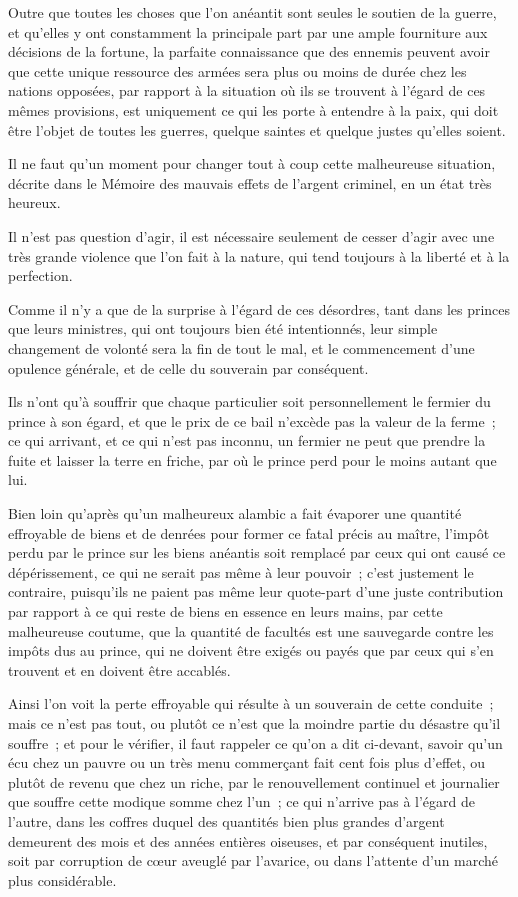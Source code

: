 \documentclass[french,twoside]{book} %
\begin{document}
Outre que toutes les choses que l’on anéantit sont seules le soutien de la guerre, et qu’elles y ont constamment la principale part par une ample fourniture aux décisions de la fortune, la parfaite connaissance que des ennemis peuvent avoir que cette unique ressource des armées sera plus ou moins de durée chez les nations opposées, par rapport à la situation où ils se trouvent à l’égard de ces mêmes provisions, est uniquement ce qui les porte à entendre à la paix, qui doit être l’objet de toutes les guerres, quelque saintes et quelque justes qu’elles soient.\par
Il ne faut qu’un moment pour changer tout à coup cette malheureuse situation, décrite dans le Mémoire des mauvais effets de l’argent criminel, en un état très heureux.\par
Il n’est pas question d’agir, il est nécessaire seulement de cesser d’agir avec une très grande violence que l’on fait à la nature, qui tend toujours à la liberté et à la perfection.\par
Comme il n’y a que de la surprise à l’égard de ces désordres, tant dans les princes que leurs ministres, qui ont toujours bien été intentionnés, leur simple changement de volonté sera la fin de tout le mal, et le commencement d’une opulence générale, et de celle du souverain par conséquent.\par
Ils n’ont qu’à souffrir que chaque particulier soit personnellement le fermier du prince à son égard, et que le prix de ce bail n’excède pas la valeur de la ferme ; ce qui arrivant, et ce qui n’est pas inconnu, un fermier ne peut que prendre la fuite et laisser la terre en friche, par où le prince perd pour le moins autant que lui.\par
Bien loin qu’après qu’un malheureux alambic a fait évaporer une quantité effroyable de biens et de denrées pour former ce fatal précis au maître, l’impôt perdu par le prince sur les biens anéantis soit remplacé par ceux qui ont causé ce dépérissement, ce qui ne serait pas même à leur pouvoir ; c’est justement le contraire, puisqu’ils ne paient pas même leur quote-part d’une juste contribution par rapport à ce qui reste de biens en essence en leurs mains, par cette malheureuse coutume, que la quantité de facultés est une sauvegarde contre les impôts dus au prince, qui ne doivent être exigés ou payés que par ceux qui s’en trouvent et en doivent être accablés.\par
Ainsi l’on voit la perte effroyable qui résulte à un souverain de cette conduite ; mais ce n’est pas tout, ou plutôt ce n’est que la moindre partie du désastre qu’il souffre ; et pour le vérifier, il faut rappeler ce qu’on a dit ci-devant, savoir qu’un écu chez un pauvre ou un très menu commerçant fait cent fois plus d’effet, ou plutôt de revenu que chez un riche, par le renouvellement continuel et journalier que souffre cette modique somme chez l’un ; ce qui n’arrive pas à l’égard de l’autre, dans les coffres duquel des quantités bien plus grandes d’argent demeurent des mois et des années entières oiseuses, et par conséquent inutiles, soit par corruption de cœur aveuglé par l’avarice, ou dans l’attente d’un marché plus considérable.\par
\end{document}
